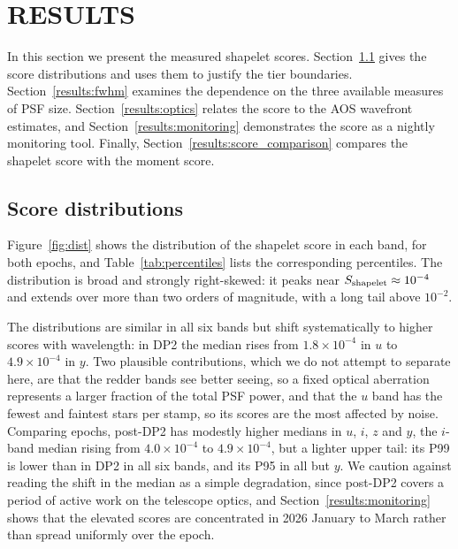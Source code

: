 \documentclass[]{spie}
\begin{document}
\section{RESULTS}
\label{results:0}

In this section we present the measured shapelet scores. Section~\ref{results:distributions}
gives the score distributions and uses them to justify the tier boundaries.
Section~\ref{results:fwhm} examines the dependence on the three available measures of PSF
size. Section~\ref{results:optics} relates the score to the AOS wavefront estimates, and
Section~\ref{results:monitoring} demonstrates the score as a nightly monitoring tool.
Finally, Section~\ref{results:score_comparison} compares the shapelet score with the moment
score.

\subsection{Score distributions}
\label{results:distributions}

Figure~\ref{fig:dist} shows the distribution of the shapelet score in each band, for both
epochs, and Table~\ref{tab:percentiles} lists the corresponding percentiles. The
distribution is broad and strongly right-skewed: it peaks near $S_{\rm shapelet} \approx
10^{-4}$ and extends over more than two orders of magnitude, with a long tail above
$10^{-2}$.

The distributions are similar in all six bands but shift systematically to higher scores
with wavelength: in DP2 the median rises from $1.8 \times 10^{-4}$ in $u$ to $4.9 \times
10^{-4}$ in $y$. Two plausible contributions, which we do not attempt to separate here, are
that the redder bands see better seeing, so a fixed optical aberration represents a larger
fraction of the total PSF power, and that the $u$ band has the fewest and faintest stars per
stamp, so its scores are the most affected by noise. Comparing epochs, post-DP2 has modestly
higher medians in $u$, $i$, $z$ and $y$, the $i$-band median rising from
$4.0 \times 10^{-4}$ to $4.9 \times 10^{-4}$, but a lighter upper tail: its P99 is lower
than in DP2 in all six bands, and its P95 in all but $y$. We caution against reading the
shift in the median as a simple degradation, since post-DP2 covers a period of active work on
the telescope optics, and Section~\ref{results:monitoring} shows that the elevated scores are
concentrated in 2026 January to March rather than spread uniformly over the epoch.
\end{document}
